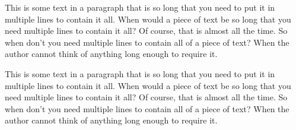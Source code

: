 \documentclass{article}
\begin{document}
This is some text in a paragraph that is so long
that you need to put it in multiple lines to contain
it all. When would a piece of text be so long that
you need multiple lines to contain it all? Of course,
that is almost all the time. So when don't you need
multiple lines to contain all of a piece of text?
When the author cannot think of anything long enough
to require it.

This is some text in a paragraph that is so long
that you need to put it in multiple lines to contain
it all. When would a piece of text be so long that
you need multiple lines to contain it all? Of course,
that is almost all the time. So when don't you need
multiple lines to contain all of a piece of text?
When the author cannot think of anything long enough
to require it.
\end{document}
